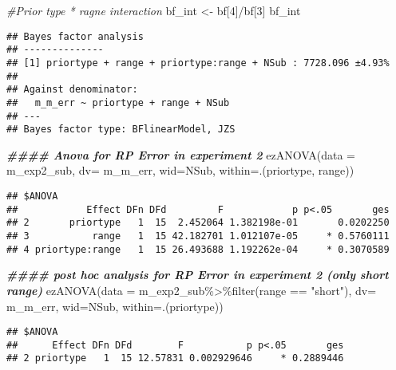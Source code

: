 \documentclass[
]{article}
\newenvironment{Shaded}{\begin{snugshade}}{\end{snugshade}}
\newcommand{\AttributeTok}[1]{\textcolor[rgb]{0.77,0.63,0.00}{#1}}
\newcommand{\CommentTok}[1]{\textcolor[rgb]{0.56,0.35,0.01}{\textit{#1}}}
\newcommand{\DecValTok}[1]{\textcolor[rgb]{0.00,0.00,0.81}{#1}}
\newcommand{\DocumentationTok}[1]{\textcolor[rgb]{0.56,0.35,0.01}{\textbf{\textit{#1}}}}
\newcommand{\FunctionTok}[1]{\textcolor[rgb]{0.00,0.00,0.00}{#1}}
\newcommand{\NormalTok}[1]{#1}
\newcommand{\OtherTok}[1]{\textcolor[rgb]{0.56,0.35,0.01}{#1}}
\newcommand{\SpecialCharTok}[1]{\textcolor[rgb]{0.00,0.00,0.00}{#1}}
\newcommand{\StringTok}[1]{\textcolor[rgb]{0.31,0.60,0.02}{#1}}
\begin{document}
\begin{Shaded}
\begin{Highlighting}[]
\CommentTok{\#Prior type * ragne interaction }
\NormalTok{bf\_int }\OtherTok{\textless{}{-}}\NormalTok{ bf[}\DecValTok{4}\NormalTok{]}\SpecialCharTok{/}\NormalTok{bf[}\DecValTok{3}\NormalTok{] }
\NormalTok{bf\_int}
\end{Highlighting}
\end{Shaded}

\begin{verbatim}
## Bayes factor analysis
## --------------
## [1] priortype + range + priortype:range + NSub : 7728.096 ±4.93%
## 
## Against denominator:
##   m_m_err ~ priortype + range + NSub 
## ---
## Bayes factor type: BFlinearModel, JZS
\end{verbatim}

\begin{Shaded}
\begin{Highlighting}[]
\DocumentationTok{\#\#\#\# Anova for RP Error in experiment 2}
 \FunctionTok{ezANOVA}\NormalTok{(}\AttributeTok{data =}\NormalTok{ m\_exp2\_sub, }\AttributeTok{dv=}\NormalTok{ m\_m\_err, }\AttributeTok{wid=}\NormalTok{NSub, }\AttributeTok{within=}\NormalTok{.(priortype, range))}
\end{Highlighting}
\end{Shaded}

\begin{verbatim}
## $ANOVA
##            Effect DFn DFd         F            p p<.05       ges
## 2       priortype   1  15  2.452064 1.382198e-01       0.0202250
## 3           range   1  15 42.182701 1.012107e-05     * 0.5760111
## 4 priortype:range   1  15 26.493688 1.192262e-04     * 0.3070589
\end{verbatim}

\begin{Shaded}
\begin{Highlighting}[]
\DocumentationTok{\#\#\#\# post hoc analysis for RP Error in experiment 2 (only short range)}
 \FunctionTok{ezANOVA}\NormalTok{(}\AttributeTok{data =}\NormalTok{ m\_exp2\_sub}\SpecialCharTok{\%\textgreater{}\%}\FunctionTok{filter}\NormalTok{(range }\SpecialCharTok{==} \StringTok{"short"}\NormalTok{), }\AttributeTok{dv=}\NormalTok{ m\_m\_err, }\AttributeTok{wid=}\NormalTok{NSub, }\AttributeTok{within=}\NormalTok{.(priortype))}
\end{Highlighting}
\end{Shaded}

\begin{verbatim}
## $ANOVA
##      Effect DFn DFd        F           p p<.05       ges
## 2 priortype   1  15 12.57831 0.002929646     * 0.2889446
\end{verbatim}
\end{document}
